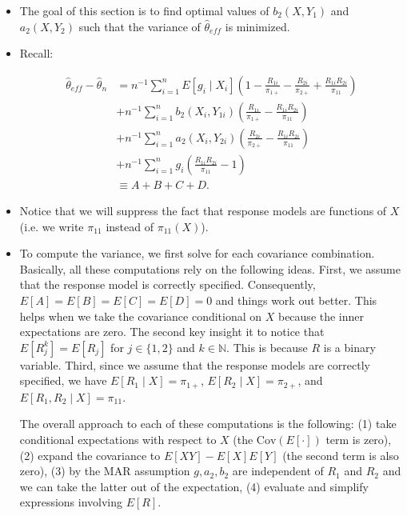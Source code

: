 \documentclass[12pt]{article}
\newcommand{\Cov}{{\text{Cov}}}
\begin{document}
\begin{itemize}
  \item The goal of this section is to find optimal values of $b_2(X, Y_1)$ and
    $a_2(X, Y_2)$ such that the variance of $\hat \theta_{eff}$ is minimized.

  \item Recall:

    \begin{align*}
      \hat \theta_{eff} - \hat \theta_n 
      &= n^{-1} \sum_{i = 1}^n E[g_i \mid X_i] \left(1 - \frac{R_{1i}}{\pi_{1+}}
      - \frac{R_{2i}}{\pi_{2+}} + \frac{R_{1i}R_{2i}}{\pi_{11}}\right) \\
      &+ n^{-1} \sum_{i = 1}^n b_2(X_i, Y_{1i}) \left(\frac{R_{1i}}{\pi_{1+}} -
      \frac{R_{1i}R_{2i}}{\pi_{11}}\right)\\
      &+ n^{-1} \sum_{i = 1}^n a_2(X_i, Y_{2i}) \left(\frac{R_{2i}}{\pi_{2+}} -
      \frac{R_{1i}R_{2i}}{\pi_{11}}\right)\\
      &+ n^{-1} \sum_{i = 1}^n g_i \left(\frac{R_{1i}R_{2i}}{\pi_{11}} -
      1\right) \\
      &\equiv A + B + C + D.
    \end{align*}

  \item Notice that we will suppress the fact that response models are functions
    of $X$ (i.e. we write $\pi_{11}$ instead of $\pi_{11}(X)$).
  
  \item To compute the variance, we first solve for each covariance combination.
    Basically, all these computations rely on the following ideas. First, we
    assume that the response model is correctly specified. Consequently,
    $E[A] = E[B] = E[C] = E[D] = 0$ and things work out better. This helps when
    we take the covariance conditional on $X$ because the inner expectations are
    zero. The second key insight it to notice that $E[R_{j}^k] = E[R_j]$ for $j
    \in \{1, 2\}$ and $k \in \mathbb{N}$. This is because $R$ is a binary
    variable. Third, since we assume that the response models are correctly
    specified, we have $E[R_1 \mid X] = \pi_{1+}$, $E[R_2 \mid X] = \pi_{2+}$,
    and $E[R_1, R_2 \mid X] = \pi_{11}$.

    The overall approach to each of these computations is the following:
    (1) take conditional expectations with respect to $X$ (the $\Cov(E[\cdot])$
    term is zero), (2) expand the covariance to $E[XY] - E[X]E[Y]$ (the second
    term is also zero), (3) by the MAR assumption $g, a_2, b_2$ are independent
    of $R_1$ and $R_2$ and we can take the latter out of the expectation, (4)
    evaluate and simplify expressions involving $E[R]$.
  

\end{itemize}
\end{document}
